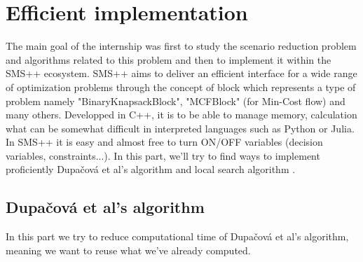 \documentclass{amsart}
\begin{document}
\section{Efficient implementation}
The main goal of the internship was first to study the scenario reduction problem and algorithms related to this problem and then to implement it within the SMS++ ecosystem. SMS++ aims to deliver an efficient interface for a wide range of optimization problems through the concept of block which represents a type of problem namely "BinaryKnapsackBlock", "MCFBlock" (for Min-Cost flow) and many others. Developped in C++, it is to be able to manage memory, calculation what can be somewhat difficult in interpreted languages such as Python or Julia. In SMS++ it is easy and almost free to turn ON/OFF variables (decision variables, constraints...). In this part, we'll try to find ways to implement proficiently Dupačová et al's algorithm  and local search algorithm .

\subsection{Dupačová et al's algorithm}
In this part we try to reduce computational time of Dupačová et al's algorithm, meaning we want to reuse what we've already computed. 
\newline
\end{document}
